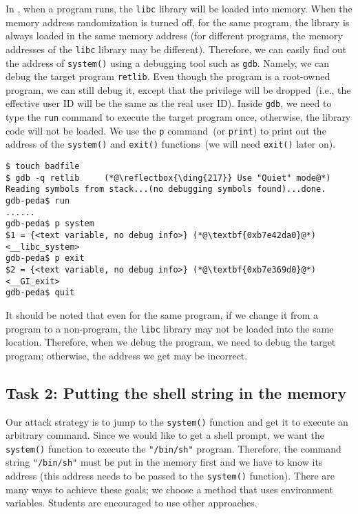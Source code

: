 In \linux, when a program runs, the \texttt{libc} library will be loaded
into memory. When the memory address randomization is turned off,
for the same program, the library is always loaded in the same memory
address (for different programs, the memory addresses
of the \texttt{libc} library may be different).
Therefore, we can easily find out the address of \texttt{system()}
using a debugging tool such as \texttt{gdb}. Namely, we can debug
the target program \texttt{retlib}. Even though the program is a root-owned \setuid program,
we can still debug it, except that the privilege will be dropped~(i.e., the effective user ID
will be the same as the real user ID).
Inside \texttt{gdb}, we need to type the \texttt{run} command to execute the target program once,
otherwise, the library code will not be loaded.
We use the \texttt{p} command~(or \texttt{print}) to print out the address of
the \texttt{system()} and \texttt{exit()} functions~(we will need \texttt{exit()} later on).

\begin{lstlisting}
$ touch badfile
$ gdb -q retlib     (*@\reflectbox{\ding{217}} Use "Quiet" mode@*)
Reading symbols from stack...(no debugging symbols found)...done.
gdb-peda$ run
......
gdb-peda$ p system
$1 = {<text variable, no debug info>} (*@\textbf{0xb7e42da0}@*) <__libc_system>
gdb-peda$ p exit
$2 = {<text variable, no debug info>} (*@\textbf{0xb7e369d0}@*) <__GI_exit>
gdb-peda$ quit
\end{lstlisting}

It should be noted that even for the same program, if we change it from a \setuid
program to a non-\setuid program, the \texttt{libc} library may not be loaded
into the same location. Therefore, when we debug the program, we need
to debug the target \setuid program; otherwise, the address we
get may be incorrect.




\subsection{Task 2: Putting the shell string in the memory}

Our attack strategy is to jump to the \texttt{system()} function and 
get it to execute an arbitrary command. Since we would like to 
get a shell prompt, we want the \texttt{system()} function
to execute the \texttt{"/bin/sh"} program. Therefore, the 
command string \texttt{"/bin/sh"} must be put in the memory first and 
we have to know its address (this address needs to be passed to 
the \texttt{system()} function). There are many ways to
achieve these goals; we choose a method that uses environment variables.
Students are encouraged to use other approaches. 


